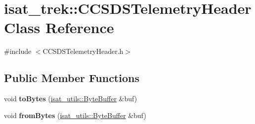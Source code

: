 \hypertarget{classisat__trek_1_1_c_c_s_d_s_telemetry_header}{}\section{isat\+\_\+trek\+:\+:C\+C\+S\+D\+S\+Telemetry\+Header Class Reference}
\label{classisat__trek_1_1_c_c_s_d_s_telemetry_header}


{\ttfamily \#include $<$C\+C\+S\+D\+S\+Telemetry\+Header.\+h$>$}

\subsection*{Public Member Functions}
\begin{DoxyCompactItemize}
\item 
void {\bfseries to\+Bytes} (\hyperlink{classisat__utils_1_1_byte_buffer}{isat\+\_\+utils\+::\+Byte\+Buffer} \&buf)\hypertarget{classisat__trek_1_1_c_c_s_d_s_telemetry_header_a43d6355a1e75990cb6b57827b265cc4a}{}\label{classisat__trek_1_1_c_c_s_d_s_telemetry_header_a43d6355a1e75990cb6b57827b265cc4a}

\item 
void {\bfseries from\+Bytes} (\hyperlink{classisat__utils_1_1_byte_buffer}{isat\+\_\+utils\+::\+Byte\+Buffer} \&buf)\hypertarget{classisat__trek_1_1_c_c_s_d_s_telemetry_header_ad1b88c7c9321fa020ccf66d4057a25ed}{}\label{classisat__trek_1_1_c_c_s_d_s_telemetry_header_ad1b88c7c9321fa020ccf66d4057a25ed}

\end{DoxyCompactItemize}
